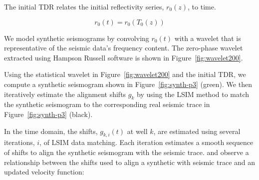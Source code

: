 The initial TDR relates the initial reflectivity series, $r_0(z)$, to time. 

\begin{equation} \label{eq:rpt}
r_0(t) = r_0(T_0(z))
\end{equation}

We model synthetic seismograms by convolving $r_0(t)$ with a wavelet that is representative of the seismic data's frequency content. The zero-phase wavelet extracted using Hampson Russell software is shown in Figure~\ref{fig:wavelet200}.


Using the statistical wavelet in Figure~\ref{fig:wavelet200} and the initial TDR, we compute a synthetic seismogram shown in Figure~\ref{fig:synth-p3} (green). We then iteratively estimate the alignment shifts\new{,} $g_{k}$\new{,} by using the LSIM method to match the synthetic seismogram  to the corresponding real seismic trace in Figure~\ref{fig:synth-p3} (black).

In the time domain, the shifts, $g_{k,i}(t)$ at well $k$, are estimated using several iterations, $i$, of LSIM data matching. Each iteration estimates a smooth sequence of shifts to align the synthetic seismogram with the seismic trace. \cite{munozhale2015} and \cite{herrerab} observe a relationship between the shifts used to align a synthetic with seismic trace and an updated velocity function:

